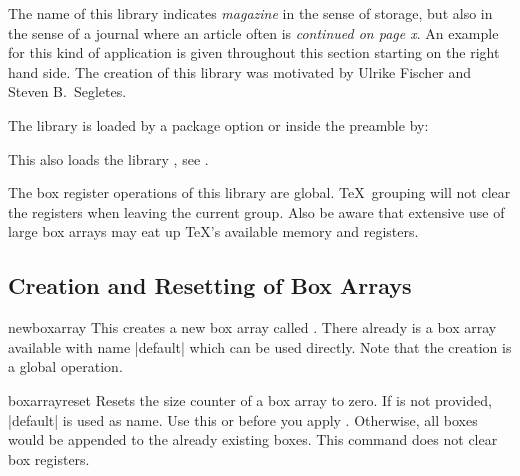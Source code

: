 The name of this library indicates \emph{magazine} in the sense of storage,
but also in the sense of a journal where an article often is \emph{continued on page x}.
An example for this kind of application is given throughout this section starting
on the right hand side. The creation of this library was motivated by
Ulrike Fischer and Steven B.~Segletes.

The library is loaded by a package option or inside the preamble by:
\begin{dispListing}
\end{dispListing}
This also loads the library , see .

\begin{marker}
The box register operations of this library are global. \TeX\ grouping will
not clear the registers when leaving the current group. Also be aware that
extensive use of large box arrays may eat up \TeX's available memory and
registers.
\end{marker}

\subsection{Creation and Resetting of Box Arrays}\label{subsec:magazine_creation}

\begin{docCommand}[doc new=2015-07-13]{newboxarray}{}
This creates a new box array called . There already is a
box array available with name |default| which can be used directly.
Note that the creation is a global operation.
\begin{dispListing}
\end{dispListing}
\end{docCommand}


\begin{docCommand}[doc new=2015-07-13]{boxarrayreset}{}
Resets the size counter of a box array  to zero.
If  is not provided, |default| is used as name.
Use this or  before
you apply . Otherwise, all boxes would
be appended to the already existing boxes.
This command does not clear box registers.
\begin{dispListing}
\boxarrayreset            %
\end{dispListing}
\end{docCommand}


